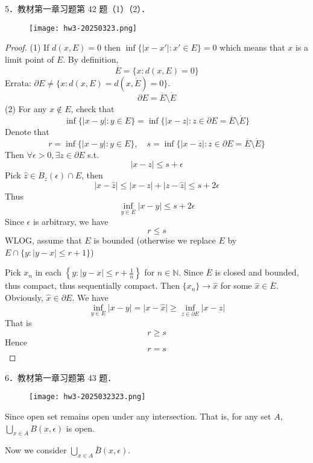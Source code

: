 \begin{exercise}
5．教材第一章习题第 42 题（1）（2）．
\begin{figure}[H]
\centering
\texttt{[image: hw3-20250323.png]}
\label{}
\end{figure}
\end{exercise}
\begin{proof}
(1)
If $d(x,E)=0$ then $\inf \{ \lvert x-x' \rvert:x'\in E \}=0$ which means that $x$ is a limit point of $E$. By definition,
\[
\overline{E}=\{ x:d(x,E)=0 \}
\]
Errata: $\partial E\neq \{ x:d(x,E)=d(x,{\mathring E})=0 \}$.
\[
\partial E=\overline{E}\setminus {\mathring E}
\]
(2)
For any $x\not\in E$, check that
\[
\inf \{ \lvert x-y \rvert :y\in E \}=\inf \{ \lvert x-z \rvert :z\in \partial E=\overline{E}\setminus{\mathring E}  \}
\]
Denote that
\[
r=\inf \{ \lvert x-y \rvert :y\in E \},\quad s=\inf \{ \lvert x-z \rvert :z\in \partial E=\overline{E}\setminus{\mathring E}  \}
\]
Then $\forall\epsilon>0,\exists z\in \partial E$ s.t.
\[
\lvert x-z \rvert \leq s+\epsilon
\]
Pick $\widehat{z}\in B_{z}(\epsilon)\cap E$, then
\[
\lvert x-\widehat{z} \rvert \leq \lvert x-z \rvert +\lvert z-\widehat{z} \rvert \leq s+2\epsilon
\]
Thus
\[
\inf_{y\in E}\lvert x-y \rvert \leq s+2\epsilon
\]
Since $\epsilon$ is arbitrary, we have
\[
r\leq s
\]
WLOG, assume that $E$ is bounded (otherwise we replace $E$ by $E\cap \{ y:\lvert y-x \rvert\leq r+1 \}$)

Pick $x_n$ in each $\left\{  y:\lvert y-x \rvert\leq r+\frac{1}{n}  \right\}$ for $n\in \mathbb{N}$. Since $\overline{E}$ is closed and bounded, thus compact, thus sequentially compact. Then $\{ x_n \}\to \widehat{x}$ for some $\widehat{x}\in \overline{E}$. Obviously, $\widehat{x}\in \partial E$. We have
\[
\inf_{y\in E}\lvert x-y \rvert =\lvert x-\widehat{x} \rvert \geq \inf_{z\in \partial E}\lvert x-z \rvert
\]
That is
\[
r\geq s
\]
Hence
\[
r=s
\]
\end{proof}

\begin{exercise}
6．教材第一章习题第 43 题．
\begin{figure}[H]
\centering
\texttt{[image: hw3-2025032323.png]}
\label{}
\end{figure}
\end{exercise}
Since open set remains open under any intersection. That is, for any set $A$, $\bigcup_{x\in A}B(x,\epsilon)$ is open.

Now we consider $\bigcup_{x\in A}\overline{B}(x,\epsilon)$.

